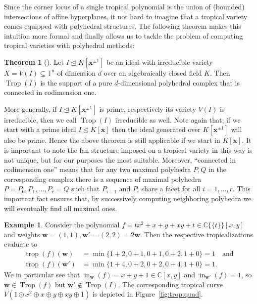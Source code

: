 \documentclass[
  paper=a4,
  titlepage,
  bibliography=totoc,
  pagesize=pdftex
]{scrartcl}
\numberwithin{figure}{section}
\numberwithin{equation}{section}
\numberwithin{table}{section}
\newcommand*\setC{\mathds{C}}
\newcommand*\setT{\mathds{T}}
\newcommand*\puiseux[2]{#1\{\!\{#2\}\!\}}
\newcommand*\CCt{\puiseux{\setC}{t}}
\let\vec\mathbf
\let\idealof\trianglelefteq
\DeclareMathOperator{\Trop}{Trop}
\DeclareMathOperator{\trop}{trop}
\DeclareMathOperator{\initial}{in}
\theoremstyle{definition}
\newtheorem{theorem}[definition]{Theorem}
\newtheorem{example}[definition]{Example}
\numberwithin{definition}{section}
\begin{document}
Since the corner locus of a single tropical polynomial is the union of (bounded)
intersections of affine hyperplanes, it not hard to imagine that a tropical variety comes
equipped with polyhedral structures. The following theorem makes this intuition more
formal and finally allows us to tackle the problem of computing tropical varieties with
polyhedral methods:

\begin{theorem}[{\cite[Theorem~3.5.1]{sturmMacTrop}}]
  \label{thm:tropComplexConn}
  Let $I \idealof K[\vec x^{\pm1}]$ be an ideal with irreducible variety $X = V(I)
  \subseteq \setT^n$ of dimension $d$ over an algebraically closed field $K$. Then
  $\Trop(I)$ is the support of a pure $d$-dimensional polyhedral complex that is connected
  in codimension one.
\end{theorem}

More generally, if $I \idealof K[\vec x^{\pm1}]$ is prime, respectively its variety $V(I)$
is irreducible, then we call $\Trop(I)$ irreducible as well. Note again that, if we start
with a prime ideal $I \idealof K[\vec x]$ then the ideal generated over $K[\vec x^{\pm1}]$
will also be prime. Hence the above theorem is still applicable if we start in $K[\vec
x]$. It is important to note the fan structure imposed on a tropical variety in this way
is not unique, but for our purposes the most suitable. Moreover, \enquote{connected in
codimension one} means that for any two maximal polyhedra $P, Q$ in the corresponding
complex there is a sequence of maximal polyhedra $P = P_0, P_1, \dots, P_r = Q$ such that
$P_{i-1}$ and $P_i$ share a facet for all $i = 1, \dots, r$. This important fact ensures
that, by successively computing neighboring polyhedra we will eventually find all maximal
ones.

\begin{example}
  \label{ex:notFan}
  Consider the polynomial $f = tx^2 + x + y + xy + t \in \CCt[x,y]$ and weights $\vec w =
  (1,1), \vec w' = (2,2) = 2 \vec w$. Then the respective tropicalizations evaluate to
  \begin{align*}
    \trop(f)(\vec w) &= \min \{ 1 + 2, 0 + 1, 0 + 1, 0 + 2, 1 + 0 \} = 1 \quad
    \text{and} \\
    \trop(f)(\vec w') &= \min \{ 1 + 4, 0 + 2, 0 + 2, 0 + 4, 1 + 0 \} = 1.
  \end{align*}
  We in particular see that $\initial_{\vec w}(f) = x+y+1 \in \setC[x,y]$ and
  $\initial_{\vec w'}(f) = 1$, so $\vec w \in \Trop(f)$ but $\vec w' \not\in \Trop(I)$.
  The corresponding tropical curve $V(1\odot x^2 \oplus x \oplus y \oplus xy \oplus 1)$ is
  depicted in Figure~\ref{fig:trop:quad}.
\end{example}
\end{document}
